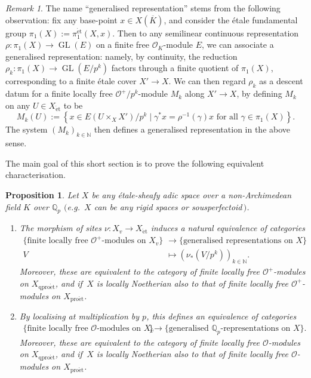 \documentclass[10pt,a4paper]{article}
\newtheorem{Proposition}[thm]{Proposition}
\theoremstyle{definition}
\theoremstyle{remark}
\newtheorem{Remark}[thm]{Remark}
\newcommand{\lra}{\longrightarrow}
\newcommand{\N}{\mathbb{N}}
\renewcommand{\O}{\mathcal{O}}
\newcommand{\Q}{\mathbb{Q}}
\newcommand{\GL}{\operatorname{GL}}
\newcommand{\et}{{\operatorname{\acute{e}t}}}
\newcommand{\proet}{{\operatorname{pro\acute{e}t}}}
\newcommand{\qproet}{{\operatorname{qpro\acute{e}t}}}
\numberwithin{equation}{section}
\begin{document}
\begin{Remark}
	The name ``generalised representation'' stems from the following observation: fix any base-point $x\in X(\overline{K})$, and consider  the \'etale fundamental group $\pi_1(X):=\pi^{\et}_1(X,x)$. Then to any semilinear continuous representation $\rho\colon \pi_1(X)\to \GL(E)$ on a finite free $\O_{K}$-module $E$, we can associate a generalised representation: namely, by continuity, the reduction $\rho_k\colon \pi_1(X)\to \GL(E/p^k)$ factors through a finite quotient of $\pi_1(X)$, corresponding to a finite \'etale cover $X'\to X$. We can then regard $\rho_k$ as a descent datum for a finite locally free $\O^+/p^k$-module $M_k$ along $X'\to X$, by defining $M_k$ on any $U\in X_{\et}$ to be
	\[ M_k(U):=\left\{x\in E(U\times_XX')/p^k\mid \gamma^\ast x= \rho^{-1}(\gamma)x \text{ for all }\gamma\in \pi_1(X)\right\}.\]
	The system $(M_k)_{k\in \N}$ then defines a generalised representation in the above sense.
\end{Remark}

The main goal of this short section is to prove the following equivalent characterisation.

\begin{Proposition}\label{t:generalised-reps-are-v-bundles}
  Let $X$ be any \'etale-sheafy adic space over a non-Archimedean field $K$ over $\Q_p$  $($e.g.\ $X$ can be any rigid spaces or sousperfectoid\,$)$.
	\begin{enumerate}
		\item\label{t:gravb-1} The morphism of sites $\nu\colon X_{v}\to X_{\et}$ induces a natural equivalence of categories
		\begin{align*}
			\{ \text{finite locally free $\O^+$-modules on $X_{v}$}\}&\lra \{ \text{generalised representations on $X$}\}\\
			V&\longmapsto \left(\nu_{\ast}\left(V/p^k\right)\right)_{k\in\N}.
		\end{align*}
		Moreover, these are equivalent to the category of finite locally free $\O^+$-modules on $X_{\qproet}$, and if\, $X$ is locally Noetherian also to that of finite locally free $\O^+$-modules on $X_{\proet}$.
		\item\label{i:generalised-Qp-reps} By localising at multiplication by $p$, this defines an equivalence of categories
		\begin{align*}
			\{ \text{finite locally free $\O$-modules on $X_{v}$}\}&\lra \{ \text{generalised $\Q_p$-representations on $X$}\}.
		\end{align*} 
		Moreover, these are equivalent to the category of finite locally free $\O$-modules on $X_{\qproet}$, and if\, $X$ is locally Noetherian also to that of finite locally free $\O$-modules on $X_{\proet}$.
	\end{enumerate}
\end{Proposition}
\end{document}
